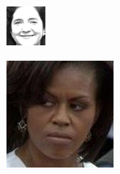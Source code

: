 \begin{figure}
	\centering
	\begin{subfigure}{0.2\textwidth}
		\includegraphics[width=\linewidth]{images/CK_happy.png}
		\caption{}
		\label{fig:subfigA}
	\end{subfigure}
   \hspace{0.15cm}
	\begin{subfigure}{0.2\textwidth}
        \includegraphics[width=\linewidth]{images/AffectNet.jpg}

\end{subfigure}
\end{figure}
